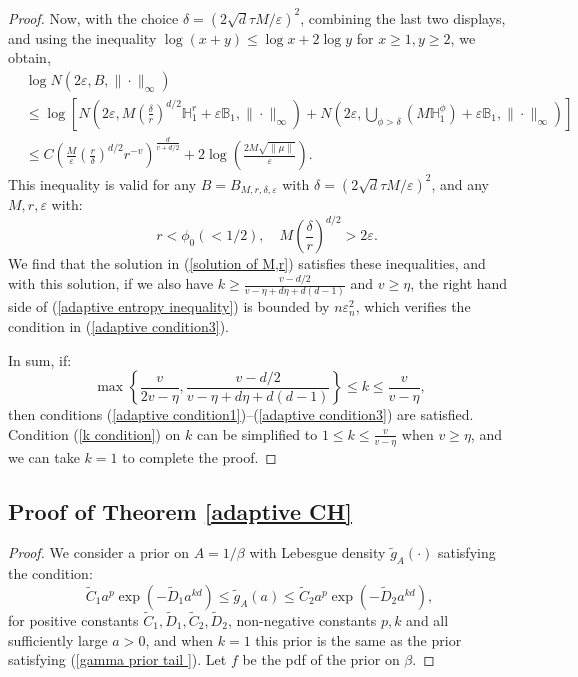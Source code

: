 \documentclass[ejs,noshowframe]{imsart}
\theoremstyle{plain}
\theoremstyle{definition}
\theoremstyle{remark}
\begin{document}
\begin{appendix}
\begin{proof}
Now, with the choice $\delta=(2 \sqrt{d} \tau M/\varepsilon)^2$, combining the last two displays, and using the inequality $\log (x+y) \leq \log x+2 \log y$ for $x \geq 1, y \geq 2$, we obtain,
\begin{equation}\label{adaptive entropy inequality}
\begin{aligned}
&\log N\left(2 \varepsilon, B,\|\cdot\|_{\infty}\right) \\
&\leq  \log \left[N\left(2 \varepsilon, M (\frac{\delta}{r})^{d/2} \mathbb{H}_1^r+\varepsilon \mathbb{B}_1,\|\cdot\|_{\infty}\right) +  N\left(2 \varepsilon, \bigcup_{\phi>\delta}\left(M \mathbb{H}_1^{\phi}\right)+\varepsilon \mathbb{B}_1,\|\cdot\|_{\infty}\right)\right] \\
& \leq C \left( \frac{M}{\varepsilon} (\frac{r}{\delta})^{d/2}r^{-v}  \right)^{\frac{d}{v+d/2}} 
+ 2\log(\frac{2 M \sqrt{\|\mu\|}}{\varepsilon}) .
\end{aligned}
\end{equation}
This inequality is valid for any $B=B_{M, r, \delta, \varepsilon}$ with $\delta=(2 \sqrt{d} \tau M/\varepsilon)^2$, and any $M, r, \varepsilon$ with:
\begin{equation}
 \quad r < \phi_0 (<1/2), \quad M (\frac{\delta}{r})^{d/2}>2 \varepsilon.
\end{equation}
We find that the solution  in (\ref{solution of M,r}) satisfies these inequalities, and with this solution, if we also have $k\ge \frac{v-d/2}{v-\eta+d\eta+d(d-1)}$ and $v \ge \eta$, the right hand side of (\ref{adaptive entropy inequality}) is bounded by $n \varepsilon_n^2$, which verifies the condition in (\ref{adaptive condition3}).

In sum, if: 
\begin{equation}\label{k condition}
\max\left\{\frac{v}{2v-\eta},\frac{v-d/2}{v-\eta+d\eta+d(d-1)}\right\}\leq k \leq \frac{v}{v-\eta},
\end{equation}
then conditions (\ref{adaptive condition1})--(\ref{adaptive condition3}) are satisfied. Condition (\ref{k condition}) on $k$  can be simplified to $1 \leq k \leq \frac{v}{v-\eta}$ when $v \ge \eta$, and we can take $k=1$ to complete the proof.
\end{proof}

\subsection{Proof of Theorem \ref{adaptive CH}}
\begin{proof}
We consider a prior on $A=1/\beta$ with Lebesgue density $\tilde{g}_A(\cdot)$  satisfying the condition: 
\begin{equation}
\tilde{C}_1 a^p \exp \left(-\tilde{D}_1 a^{kd} \right) \leq \tilde{g}_A(a) \leq \tilde{C}_2 a^p \exp \left(-\tilde{D}_2 a^{kd}  \right) ,
\end{equation}
for positive constants $\tilde{C}_1, \tilde{D}_1, \tilde{C}
_2, \tilde{D}_2$, non-negative constants $p, k$ and all  sufficiently large $a>0$,  and when $k=1$ this prior  is the same as the prior satisfying  (\ref{gamma prior tail }).
Let $f$ be the pdf of the prior on $\beta$.



\end{proof}
\end{appendix}
\end{document}
